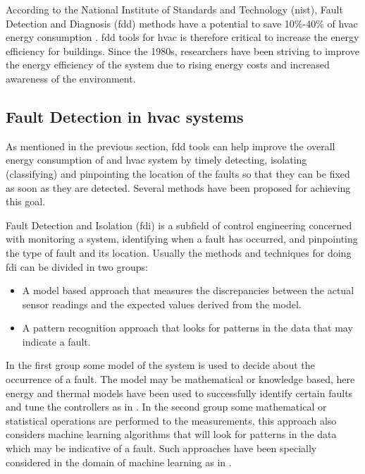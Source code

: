 According to the National Institute of Standards and Technology (\gls{nist}), Fault Detection and Diagnosis (\gls{fdd}) methods have a potential to save 10\%-40\% of \gls{hvac} energy consumption \cite{schein1}. \gls{fdd} tools for \gls{hvac} is therefore critical to increase the energy efficiency for buildings. Since the 1980s, researchers have been striving to improve the energy efficiency of the system due to rising energy costs and increased awareness of the environment.

\subsection{Fault Detection in \gls{hvac} systems}

As mentioned in the previous section, \gls{fdd} tools can help improve the overall energy consumption of and \gls{hvac} system by timely detecting, isolating (classifying) and pinpointing the location of the faults so that they can be fixed as soon as they are detected. Several methods have been proposed for achieving this goal. 

Fault Detection and Isolation (\gls{fdi}) is a subfield of control engineering concerned with monitoring a system, identifying when a fault has occurred, and pinpointing the type of fault and its location. Usually the methods and techniques for doing \gls{fdi} can be divided in two groups:

\begin{itemize}
\item A model based approach that measures the discrepancies between the actual sensor readings and the expected values derived from the model.
\item A pattern recognition approach that looks for patterns in the data that may indicate a fault.
\end{itemize}

In the first group some model of the system is used to decide about the occurrence of a fault. The model may be mathematical or knowledge based, here energy and thermal models have been used to successfully identify certain faults and tune the controllers as in \cite{wu_thesis, wei_thesis, model_fault_detection1}. In the second group some mathematical or statistical operations are performed to the measurements, this approach also considers machine learning algorithms that will look for patterns in the data which may be indicative of a fault. Such approaches have been specially considered in the domain of machine learning as in \cite{fault_detection_mechanical1, fault_diagnosis_ahu, cmeans_fault_detection, fault_diagnosis_refrigerant}.

